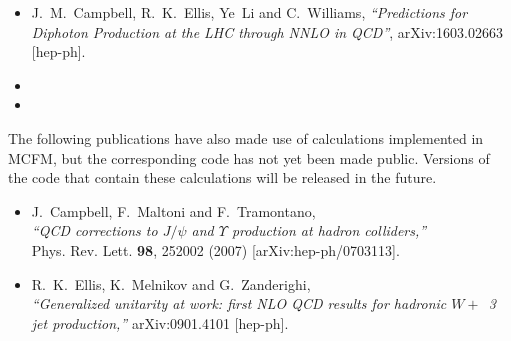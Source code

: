 \documentclass{article}
\begin{document}
{{{{{{\begin{itemize}
\item 
 J.~M.~Campbell, R.~K.~Ellis, Ye~Li and C.~Williams,
  {\it ``Predictions for Diphoton Production at the LHC through NNLO in QCD''},
  arXiv:1603.02663 [hep-ph]. 
  
\item {}

\item {}

\end{itemize}

The following publications have also made use of calculations
implemented in MCFM, but the corresponding code has not yet been made
public. Versions of the code that contain these calculations will be
released in the future.

\begin{itemize}
\item J.~Campbell, F.~Maltoni and F.~Tramontano, \\
  {\it ``QCD corrections to $J/\psi$ and $\Upsilon$ production
  at hadron colliders,''} \\
  Phys. Rev. Lett. {\bf 98}, 252002 (2007)
  [arXiv:hep-ph/0703113].
\item R.~K.~Ellis, K.~Melnikov and G.~Zanderighi,\\
  {\it ``Generalized unitarity at work: first NLO QCD results for hadronic $W+$~3 jet production,''}
  arXiv:0901.4101 [hep-ph].
\end{itemize}

\clearpage
}}}}}}
\end{document}

